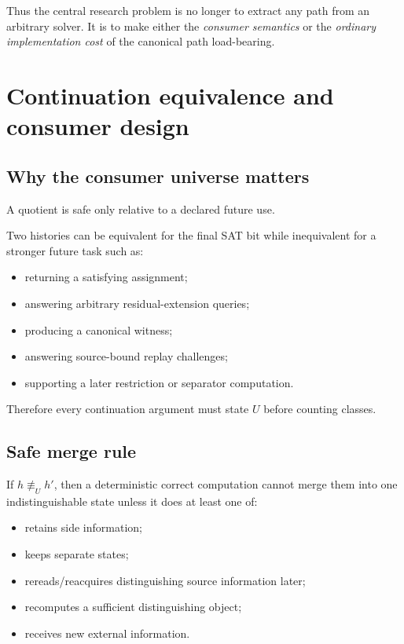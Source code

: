 \documentclass[11pt]{article}
\theoremstyle{plain}
\theoremstyle{definition}
\theoremstyle{remark}
\begin{document}
Thus the central research problem is no longer to extract any path from an
arbitrary solver.  It is to make either the \emph{consumer semantics} or the
\emph{ordinary implementation cost} of the canonical path load-bearing.

\section{Continuation equivalence and consumer design}

\subsection{Why the consumer universe matters}

A quotient is safe only relative to a declared future use.

Two histories can be equivalent for the final SAT bit while inequivalent for a
stronger future task such as:

\begin{itemize}[leftmargin=1.4em]
\item returning a satisfying assignment;
\item answering arbitrary residual-extension queries;
\item producing a canonical witness;
\item answering source-bound replay challenges;
\item supporting a later restriction or separator computation.
\end{itemize}

Therefore every continuation argument must state $U$ before counting classes.

\subsection{Safe merge rule}

If $h\not\equiv_Uh'$, then a deterministic correct computation cannot merge
them into one indistinguishable state unless it does at least one of:

\begin{itemize}[leftmargin=1.4em]
\item retains side information;
\item keeps separate states;
\item rereads/reacquires distinguishing source information later;
\item recomputes a sufficient distinguishing object;
\item receives new external information.
\end{itemize}
\end{document}
